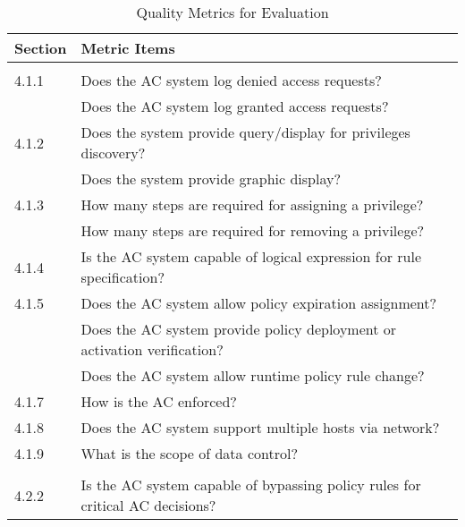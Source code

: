 {   
    \renewcommand{\arraystretch}{1.5}%
    \begin{table}[htb]
        \centering
        \small
        
        \caption{Quality Metrics for Evaluation}
        \label{tab:qualityMetrics}
        \begin{tabular}{l|l}
            \hline \bf Section & \bf Metric Items \\ \hline
            \rowcolor{lightgray} \multicolumn{2}{l}{Administration Properties} \\ \hline 
            4.1.1            & \llap{\textbullet} Does the AC system log denied access requests?  \\
                & \llap{\textbullet} Does the AC system log granted access requests? \\ \hline
            4.1.2 & \llap{\textbullet} Does the system provide query/display for privileges discovery? \\
                & \llap{\textbullet} Does the system provide graphic display? \\ \hline
            4.1.3 & \llap{\textbullet} How many steps are required for assigning a privilege? \\
                & \llap{\textbullet} How many steps are required for removing a privilege? \\ \hline
            4.1.4 & \llap{\textbullet} Is the AC system capable of logical expression for rule specification? \\ \hline
            4.1.5 & \llap{\textbullet} Does the AC system allow policy expiration assignment? \\ 
                & \llap{\textbullet} Does the AC system provide policy deployment or activation verification? \\
                & \llap{\textbullet} Does the AC system allow runtime policy rule change? \\ \hline
            4.1.7 & \llap{\textbullet} How is the AC enforced? \\ \hline
            4.1.8 & \llap{\textbullet} Does the AC system support multiple hosts via network? \\ \hline
            4.1.9 & \llap{\textbullet} What is the scope of data control? \\
            \hline \rowcolor{lightgray} \multicolumn{2}{l}{Enforcement Properties} \\ \hline
            4.2.2 & \llap{\textbullet} Is the AC system capable of bypassing policy rules for critical AC decisions? \\ \hline

\end{tabular}
\end{table}}

